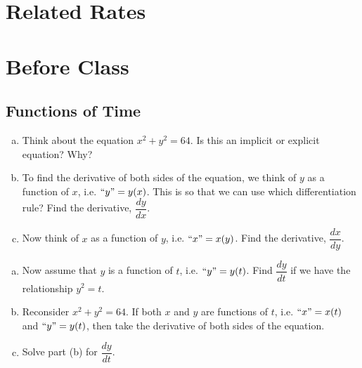 \documentclass[notes]{subfiles}
\begin{document}
	\setcounter{section}{8}
	\fancyhead[LO,RE]{\bfseries \currentname}
	\fancyfoot[C]{{}}
	\fancyfoot[RO,LE]{\large \thepage}	%

\section*{Related Rates}\label{cs28}
	\section*{Before Class}
	\subsection*{Functions of Time}
		\begin{ex}
			\begin{enumerate}[(a)]
				\item Think about the equation $x^2 + y^2 = 64$.  Is this an implicit or explicit equation?  Why?
					
				\item To find the derivative of both sides of the equation, we think of $y$ as a function of $x$, i.e. $``y\text{''} = y(x)$.  This is so that we can use which differentiation rule?  Find the derivative, $\dfrac{dy}{dx}$.
					
				\item Now think of $x$ as a function of $y$, i.e. $``x\text{''} =x(y)$.  Find the derivative, $\dfrac{dx}{dy}$.  
					
			\end{enumerate}
		\end{ex}
		
		\begin{ex}
			\begin{enumerate}[(a)]
				\item Now assume that $y$ is a function of $t$, i.e. $``y\text{''} = y(t)$.  Find $\dfrac{dy}{dt}$ if we have the relationship $y^2 = t$.
					\vs{1}
					\newpage
					
				\item Reconsider $x^2 + y^2 = 64$.  If both $x$ and $y$ are functions of $t$, i.e. $``x\text{''} =x(t)$ and $``y\text{''} =y(t)$, then take the derivative of both sides of the equation.
					\vs{1}
					
				\item Solve part (b) for $\dfrac{dy}{dt}$.
					\vs{1}
					
			\end{enumerate}
		\end{ex}
		
\end{document}
